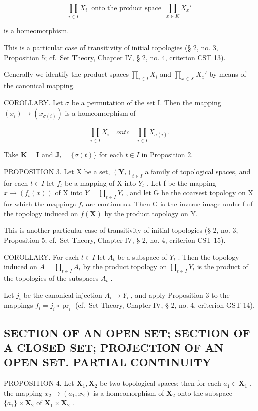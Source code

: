 \[\prod_{i \in I} X_i\ \text{ onto the product space }\ \prod_{x \in K} X_x'\]

is a homeomorphism.

This is a particular case of transitivity of initial topologies (§ 2, no. 3, Proposition 5; cf.~Set Theory, Chapter IV, § 2, no. 4, criterion CST 13).

Generally we identify the product spaces \(\prod_{i\in I}X_i\) and \(\prod_{x\in X}X_x'\) by means of the canonical mapping.

COROLLARY. Let \(\sigma\) be a permutation of the set I. Then the mapping \((x_{i})\to (x_{\sigma(i)})\) is a homeomorphism of

\[
\prod_ {i \in I} X _ {i} \quad onto \quad \prod_ {i \in I} X _ {\sigma (i)}.
\]

Take \(\mathbf{K} = \mathbf{I}\) and \(\mathbf{J}_t = \{\sigma(t)\}\) for each \(t \in I\) in Proposition 2.

PROPOSITION 3. Let X be a set, \((\mathbf{Y}_{t})_{t\in I}\) a family of topological spaces, and for each \(t\in I\) let \(f_{t}\) be a mapping of X into \(Y_{t}\) . Let f be the mapping \(x\to(f_{t}(x))\) of X into \(Y=\prod_{t\in I}Y_{t}\) , and let G be the coarsest topology on X for which the mappings \(f_{t}\) are continuous. Then G is the inverse image under f of the topology induced on \(f(\mathbf{X})\) by the product topology on Y.

This is another particular case of transitivity of initial topologies (§ 2, no. 3, Proposition 5; cf.~Set Theory, Chapter IV, § 2, no. 4, criterion CST 15).

COROLLARY. For each \(t \in I\) let \(A_{t}\) be a subspace of \(Y_{t}\) . Then the topology induced on \(A = \prod_{t \in I} A_{t}\) by the product topology on \(\prod_{t \in I} Y_{t}\) is the product of the topologies of the subspaces \(A_{t}\) .

Let \(j_{i}\) be the canonical injection \(A_{i} \to Y_{i}\) , and apply Proposition 3 to the mappings \(f_{i} = j_{i} \circ \operatorname{pr}_{i}\) (cf.~Set Theory, Chapter IV, § 2, no. 4, criterion GST 14).

\subsection{SECTION OF AN OPEN SET; SECTION OF A CLOSED SET; PROJECTION OF AN OPEN SET. PARTIAL CONTINUITY}

PROPOSITION 4. Let \(\mathbf{X}_1, \mathbf{X}_2\) be two topological spaces; then for each \(a_1 \in \mathbf{X}_1\) , the mapping \(x_2 \to (a_1, x_2)\) is a homeomorphism of \(\mathbf{X}_2\) onto the subspace \(\{a_1\} \times \mathbf{X}_2\) of \(\mathbf{X}_1 \times \mathbf{X}_2\) .

